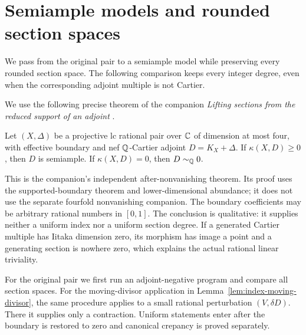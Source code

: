 \section{Semiample models and rounded section spaces}
\label{sec:reductions}

We pass from the original pair to a semiample model while preserving
every rounded section space. The following comparison keeps every
integer degree, even when the corresponding adjoint multiple is not
Cartier.

We use the following precise theorem of the companion
\emph{Lifting sections from the reduced support of an adjoint}
\cite[Theorem~\BANumber]{OpenAILifting}.

\begin{theorem}\label{thm:fourfold}
Let $(X,\Delta)$ be a projective lc rational pair over $\mathbb C$ of
 dimension at most four, with effective boundary and nef
 $\mathbb Q$-Cartier adjoint $D=K_X+\Delta$. If $\kappa(X,D)\ge0$,
 then $D$ is semiample. If $\kappa(X,D)=0$, then $D\sim_{\mathbb Q}0$.
\end{theorem}

This is the companion's independent after-nonvanishing theorem. Its proof
uses the supported-boundary theorem and lower-dimensional abundance;
it does not use the separate fourfold nonvanishing companion. The boundary
coefficients may be arbitrary rational numbers in $[0,1]$. The conclusion
is qualitative: it supplies neither a uniform index nor a uniform
section degree. If a generated Cartier multiple has Iitaka dimension
zero, its morphism has image a point and a generating section is nowhere
zero, which explains the actual rational linear triviality.

For the original pair we first run an adjoint-negative program and
compare all section spaces. For the moving-divisor application in
Lemma~\ref{lem:index-moving-divisor}, the same procedure applies to a
small rational perturbation $(V,\delta D)$. There it supplies only a
contraction. Uniform statements enter after the boundary is restored
to zero and canonical crepancy is proved separately.

